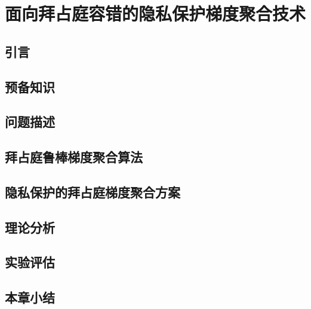 \chapter{面向拜占庭容错的隐私保护梯度聚合技术}

\section{引言}

\section{预备知识}

\section{问题描述}

\section{拜占庭鲁棒梯度聚合算法}

\section{隐私保护的拜占庭梯度聚合方案}

\section{理论分析}

\section{实验评估}

\section{本章小结}